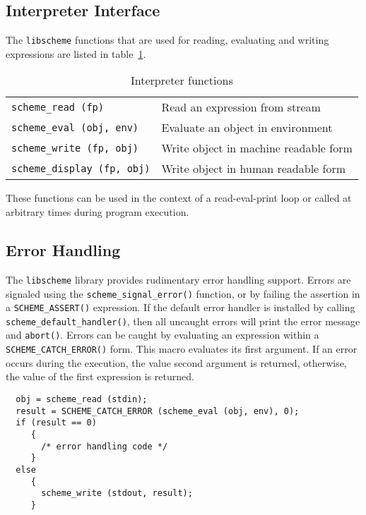 \subsection{Interpreter Interface}

The \verb+libscheme+ functions that are used for reading, evaluating
and writing expressions are listed in table~\ref{tab:interp}.

\begin{table}[htbp]
\begin{center}
  \begin{tabular}{ll}
    \verb+scheme_read (fp)+ & Read an expression from stream \\
    \verb+scheme_eval (obj, env)+ & Evaluate an object in environment \\
    \verb+scheme_write (fp, obj)+ & Write object in machine readable form \\
    \verb+scheme_display (fp, obj)+ & Write object in human readable form
  \end{tabular}
\end{center}
  \caption{Interpreter functions}
  \label{tab:interp}
\end{table}

These functions can be used in the context of a read-eval-print loop
or called at arbitrary times during program execution.

\subsection{Error Handling}

The \verb+libscheme+ library provides rudimentary error handling
support.  Errors are signaled using the \verb+scheme_signal_error()+
function, or by failing the assertion in a \verb+SCHEME_ASSERT()+
expression.  If the default error handler is installed by calling
\verb+scheme_default_handler()+, then all uncaught errors will print
the error message and \verb+abort()+.  Errors can be caught by
evaluating an expression within a \verb+SCHEME_CATCH_ERROR()+ form.
This macro evaluates its first argument.  If an error occurs during
the execution, the value second argument is returned, otherwise, the
value of the first expression is returned.

\begin{verbatim}
  obj = scheme_read (stdin);
  result = SCHEME_CATCH_ERROR (scheme_eval (obj, env), 0);
  if (result == 0)
     {
       /* error handling code */
     }
  else
     {
       scheme_write (stdout, result);
     }
\end{verbatim}

